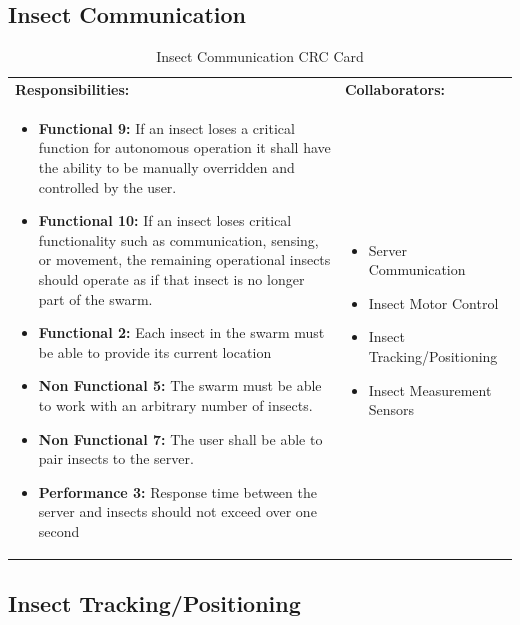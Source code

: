 \documentclass[11pt]{article}
\begin{document}
\subsection{Insect Communication}
\begin{table}[H]
\centering
\label{my-label}
\begin{tabular}{ | >{\raggedright\arraybackslash}p{} | >{\raggedright\arraybackslash}p{} | }
\hline
\multicolumn{2}{|c|}{\textbf{HydroSwarm}}             \\ \hline
\textbf{Responsibilities:} & \textbf{Collaborators:} \\ \hline
\begin{itemize}
\item \textbf{Functional 9:} If an insect loses a critical function for autonomous operation it shall have the ability to be manually overridden and controlled by
the user.
\item \textbf{Functional 10:}  If an insect loses critical functionality such as communication,
sensing, or movement, the remaining operational insects should operate as if that
insect is no longer part of the swarm.
\item \textbf{Functional 2:} Each insect in the swarm must be able to provide its current location
\item \textbf{Non Functional 5:} The swarm must be able to work with an arbitrary number of
insects.
\item \textbf{Non Functional 7:} The user shall be able to pair insects to the server.
\item \textbf{Performance 3:} Response time between the server and insects should not exceed over one second
\end{itemize}
&

\begin{itemize}
\item Server Communication
\item Insect Motor Control
\item Insect Tracking/Positioning
\item Insect Measurement Sensors
\end{itemize} \\ \hline
\end{tabular}
\caption{Insect Communication CRC Card}
\end{table}

\subsection{Insect Tracking/Positioning}
\end{document}
